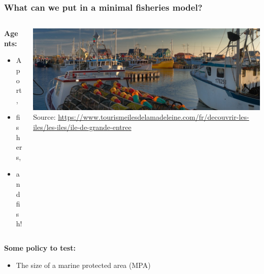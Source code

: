 \documentclass[table, 14pt, aspectratio=169]{beamer}
\newcommand{\hl}[1]{\textcolor{OxfordBlue}{\textbf{#1}}}
\begin{document}
\begin{frame}[t]\frametitle{What can we put in a minimal fisheries model?}
  \Large
  \vfill
  \begin{columns}[T]
    \begin{column}{0.3\textwidth}
      \hl{Agents:}
      \begin{itemize}
        \item A port,
        \item fishers,
        \item and fish!
      \end{itemize}
    \end{column}
    \begin{column}{0.6\textwidth}
      \includegraphics[width=\textwidth]{images/port.jpg}\\
      \tiny Source: \url{https://www.tourismeilesdelamadeleine.com/fr/decouvrir-les-iles/les-iles/ile-de-grande-entree}
    \end{column}
  \end{columns}
  \vfill
      \hl{Some policy to test:}
      \begin{itemize}
        \item The size of a marine protected area (MPA)
      \end{itemize}
\end{frame}
\end{document}
